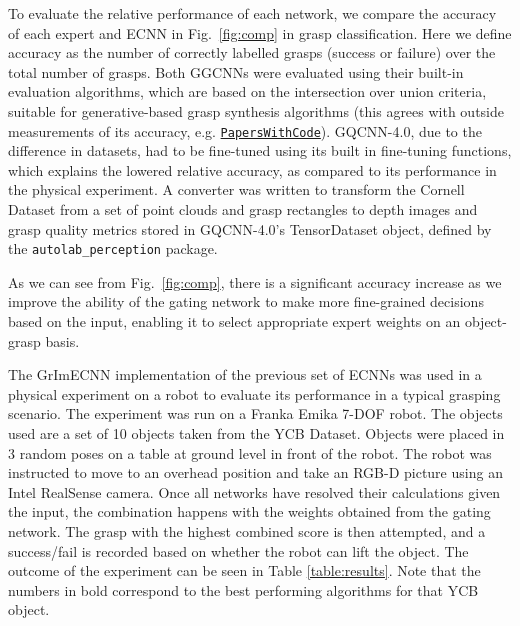 \documentclass[letterpaper, 10 pt, conference]{ieeeconf}
\begin{document}
To evaluate the relative performance of each network, we compare the accuracy of each expert and ECNN in Fig.~\ref{fig:comp} in grasp classification. Here we define accuracy as the number of correctly labelled grasps (success or failure) over the total number of grasps.  Both GGCNNs were evaluated using their built-in evaluation algorithms, which are based on the intersection over union criteria, suitable for generative-based grasp synthesis algorithms (this agrees with outside measurements of its accuracy, e.g. \href{https://paperswithcode.com/paper/closing-the-loop-for-robotic-grasping-a-real}{\texttt{PapersWithCode}}). GQCNN-4.0, due to the difference in datasets, had to be fine-tuned using its built in fine-tuning functions, which explains the lowered relative accuracy, as compared to its performance in the physical experiment. A converter was written to transform the Cornell Dataset from a set of point clouds and grasp rectangles to depth images and grasp quality metrics stored in GQCNN-4.0's TensorDataset object, defined by the \texttt{autolab\_perception} package.

As we can see from Fig.~\ref{fig:comp}, there is a significant accuracy increase as we improve the ability of the gating network to make more fine-grained decisions based on the input, enabling it to select appropriate expert weights on an object-grasp basis.

The GrImECNN implementation of the previous set of ECNNs was used in a physical experiment on a robot to evaluate its performance in a typical grasping scenario. The experiment was run on a Franka Emika 7-DOF robot. The objects used are a set of 10 objects taken from the YCB Dataset\cite{ycb_dataset}.  Objects were placed in 3 random poses on a table at ground level in front of the robot. The robot was instructed to move to an overhead position and take an RGB-D picture using an Intel RealSense camera. Once all networks have resolved their calculations given the input, the combination happens with the weights obtained from the gating network. The grasp with the highest combined score is then attempted, and a success/fail is recorded based on whether the robot can lift the object. The outcome of the experiment can be seen in Table \ref{table:results}. Note that the numbers in bold correspond to the best performing algorithms for that YCB object.
\end{document}
